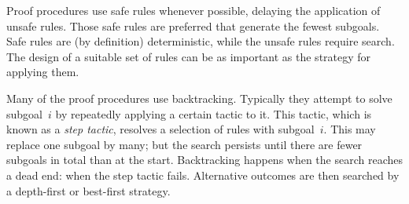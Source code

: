 Proof procedures use safe rules whenever possible, delaying the application
of unsafe rules. Those safe rules are preferred that generate the fewest
subgoals. Safe rules are (by definition) deterministic, while the unsafe
rules require search. The design of a suitable set of rules can be as
important as the strategy for applying them.

Many of the proof procedures use backtracking.  Typically they attempt to
solve subgoal~$i$ by repeatedly applying a certain tactic to it.  This
tactic, which is known as a {\it step tactic}, resolves a selection of
rules with subgoal~$i$. This may replace one subgoal by many; but the
search persists until there are fewer subgoals in total than at the start.
Backtracking happens when the search reaches a dead end: when the step
tactic fails.  Alternative outcomes are then searched by a depth-first or
best-first strategy.  
